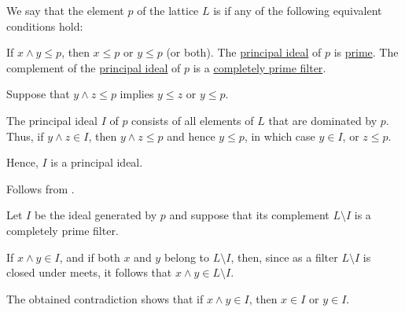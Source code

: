 \begin{definition}\label{def:lattice_prime_element}
  We say that the element \( p \) of the lattice \( L \) is  if any of the following equivalent conditions hold:
  \begin{thmenum}
     If \( x \wedge y \leq p \), then \( x \leq p \) or \( y \leq p \) (or both).
     The \hyperref[def:lattice_ideal/principal]{principal ideal} of \( p \) is \hyperref[def:lattice_ideal/prime]{prime}.
     The complement of the \hyperref[def:lattice_ideal/principal]{principal ideal} of \( p \) is a \hyperref[def:lattice_ideal/prime]{completely prime filter}.
  \end{thmenum}
\end{definition}
\begin{defproof}
   Suppose that \( y \wedge z \leq p \) implies \( y \leq z \) or \( y \leq p \).

  The principal ideal \( I \) of \( p \) consists of all elements of \( L \) that are dominated by \( p \). Thus, if \( y \wedge z \in I \), then \( y \wedge z \leq p \) and hence \( y \leq p \), in which case \( y \in I \), or \( z \leq p \).

  Hence, \( I \) is a principal ideal.

   Follows from .

   Let \( I \) be the ideal generated by \( p \) and suppose that its complement \( L \setminus I \) is a completely prime filter.

  If \( x \wedge y \in I \), and if both \( x \) and \( y \) belong to \( L \setminus I \), then, since as a filter \( L \setminus I \) is closed under meets, it follows that \( x \wedge y \in L \setminus I \).

  The obtained contradiction shows that if \( x \wedge y \in I \), then \( x \in I \) or \( y \in I \).
\end{defproof}
